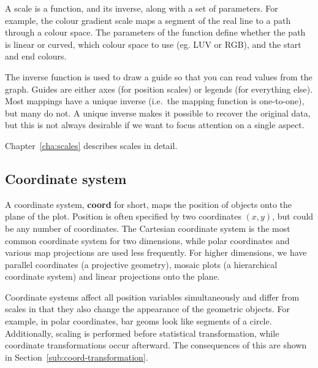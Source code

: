 
A scale is a function, and its inverse, along with a set of parameters.  For example, the colour gradient scale maps a segment of the real line to a path through a colour space.  The parameters of the function define whether the path is linear or curved, which colour space to use (eg. LUV or RGB), and the start and end colours.  

The inverse function is used to draw a guide so that you can read values from the graph.  Guides are either axes (for position scales) or legends (for everything else).  Most mappings have a unique inverse (i.e.\ the mapping function is one-to-one), but many do not.  A unique inverse makes it possible to recover the original data, but this is not always desirable if we want to focus attention on a single aspect.

Chapter~\ref{cha:scales} describes scales in detail.

\subsection{Coordinate system}\label{sec:coordinate_systems}

A coordinate system, {\bf coord} for short, maps the position of objects onto the plane of the plot.  Position is often specified by two coordinates $(x, y)$, but could be any number of coordinates.  The Cartesian coordinate system is the most common coordinate system for two dimensions, while polar coordinates and various map projections are used less frequently.  For higher dimensions, we have parallel coordinates (a projective geometry), mosaic plots (a hierarchical coordinate system) and linear projections onto the plane.

Coordinate systems affect all position variables simultaneously and differ from scales in that they also change the appearance of the geometric objects.  For example, in polar coordinates, bar geoms look like segments of a circle.  Additionally, scaling is performed before statistical transformation, while coordinate transformations occur afterward.  The consequences of this are shown in Section~\ref{sub:coord-transformation}.

